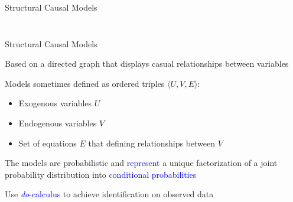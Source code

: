 \documentclass[notes,11pt, aspectratio=169, usenames, dvipsnames]{beamer}
\newenvironment{wideitemize}{\itemize\addtolength{\itemsep}{10pt}}{\enditemize}
\begin{document}
\begin{frame}{Structural Causal Models}
\begin{columns}[c]
\begin{column}{0.4\textwidth}
{{				}
			}
		\end{column}
	\end{columns}
\end{frame}

\begin{frame}{Structural Causal Models}
	\begin{wideitemize}
		\item<1-> Based on a directed graph that displays casual relationships between variables
		\item Models sometimes defined as ordered triples $\langle U, V, E \rangle$:
		\begin{itemize}
			\item Exogenous variables $U$
			\item Endogenous variables $V$
			\item Set of equations $E$ that defining relationships between $V$ 
		\end{itemize}
		\item<2-> The models are probabilistic and \textcolor{blue}{represent} a unique factorization of a joint probability distribution into \textcolor{blue}{conditional probabilities}
		\item<3-> Use \textcolor{blue}{\textit{do}-calculus} to achieve identification on observed data
	\end{wideitemize}
\end{frame}
\end{document}
